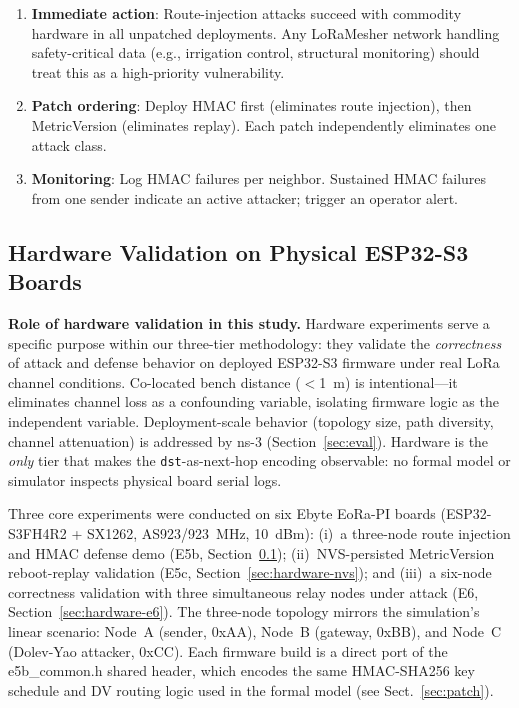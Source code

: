 \documentclass[preprint,12pt]{elsarticle}
\begin{document}
\begin{enumerate}
  \item \textbf{Immediate action}: Route-injection attacks succeed
    with commodity hardware in all unpatched deployments. Any
    LoRaMesher network handling safety-critical data (e.g.,
    irrigation control, structural monitoring) should treat this
    as a high-priority vulnerability.
  \item \textbf{Patch ordering}: Deploy HMAC first (eliminates
    route injection), then MetricVersion (eliminates replay).
    Each patch independently eliminates one attack class.
  \item \textbf{Monitoring}: Log HMAC failures per neighbor.
    Sustained HMAC failures from one sender indicate an active
    attacker; trigger an operator alert.
\end{enumerate}

\subsection{Hardware Validation on Physical ESP32-S3 Boards}
\label{sec:hardware-validation}

\textbf{Role of hardware validation in this study.}
Hardware experiments serve a specific purpose within our three-tier
methodology: they validate the \emph{correctness} of attack and
defense behavior on deployed ESP32-S3 firmware under real LoRa
channel conditions.
Co-located bench distance ($<$1~m) is intentional—it eliminates
channel loss as a confounding variable, isolating firmware logic
as the independent variable.
Deployment-scale behavior (topology size, path diversity, channel
attenuation) is addressed by ns-3 (Section~\ref{sec:eval}).
Hardware is the \emph{only} tier that makes the \texttt{dst}-as-next-hop
encoding observable: no formal model or simulator inspects
physical board serial logs.

Three core experiments were conducted on six Ebyte EoRa-PI boards
(ESP32-S3FH4R2 + SX1262, AS923/923~MHz, 10~dBm):
(i)~a three-node route injection and HMAC defense demo (E5b,
Section~\ref{sec:hardware-validation});
(ii)~NVS-persisted MetricVersion reboot-replay validation (E5c,
Section~\ref{sec:hardware-nvs}); and
(iii)~a six-node correctness validation with three simultaneous
relay nodes under attack (E6, Section~\ref{sec:hardware-e6}).
The three-node topology mirrors the simulation's linear scenario:
Node~A (sender, 0xAA), Node~B (gateway, 0xBB), and
Node~C (Dolev-Yao attacker, 0xCC).
Each firmware build is a direct port of the e5b\_common.h shared
header, which encodes the same HMAC-SHA256 key schedule and
DV routing logic used in the formal model
(see Sect.~\ref{sec:patch}).
\end{document}

